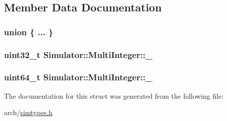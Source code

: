 \subsection{Member Data Documentation}
\hypertarget{struct_simulator_1_1_multi_integer_a4a9995ab26f63f07b9a26058cb9a8384}{\subsubsection[{"@74}]{\setlength{\rightskip}{0pt plus 5cm}union \{ ... \} }}\label{struct_simulator_1_1_multi_integer_a4a9995ab26f63f07b9a26058cb9a8384}
\hypertarget{struct_simulator_1_1_multi_integer_a3037bb9b00b17191eb16497974e8702c}{
\subsubsection[{\+\_\+32}]{\setlength{\rightskip}{0pt plus 5cm}uint32\+\_\+t Simulator\+::\+Multi\+Integer\+::\+\_}}\label{struct_simulator_1_1_multi_integer_a3037bb9b00b17191eb16497974e8702c}
\hypertarget{struct_simulator_1_1_multi_integer_ab32c1fdc288ec2423a23adde779cd4d7}{
\subsubsection[{\+\_\+64}]{\setlength{\rightskip}{0pt plus 5cm}uint64\+\_\+t Simulator\+::\+Multi\+Integer\+::\+\_}}\label{struct_simulator_1_1_multi_integer_ab32c1fdc288ec2423a23adde779cd4d7}


The documentation for this struct was generated from the following file\+:\begin{DoxyCompactItemize}
\item 
arch/\hyperlink{simtypes_8h}{simtypes.\+h}\end{DoxyCompactItemize}
